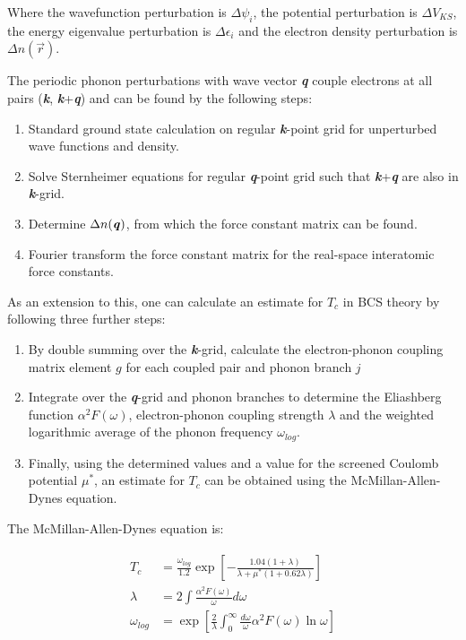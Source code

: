 \documentclass[a4paper,12pt]{article}
\begin{document}
\noindent Where the wavefunction perturbation is $\Delta\psi_i$, the potential perturbation is $\Delta V_{KS}$, the energy eigenvalue perturbation is $\Delta\epsilon_i$ and the electron density perturbation is $\Delta n(\vec{r})$.

\bigskip
\noindent The periodic phonon perturbations with wave vector \textbf{\textit{q}} couple electrons at all pairs (\textbf{\textit{k}}, \textbf{\textit{k}}+\textbf{\textit{q}}) and can be found by the following steps:

\begin{enumerate}
	\item Standard ground state calculation on regular \textbf{\textit{k}}-point grid for unperturbed wave functions and density.
	\item Solve Sternheimer equations for regular \textbf{\textit{q}}-point grid such that \textbf{\textit{k}}+\textbf{\textit{q}} are also in \textbf{\textit{k}}-grid.
	\item Determine $\Delta n(\textbf{\textit{q}})$, from which the force constant matrix can be found.
	\item Fourier transform the force constant matrix for the real-space interatomic force constants.
\end{enumerate}

\noindent As an extension to this, one can calculate an estimate for $T_c$ in BCS theory by following three further steps:

\begin{enumerate}
	\item By double summing over the \textit{\textbf{k}}-grid, calculate the electron-phonon coupling matrix element $g$ for each coupled pair and phonon branch $j$
	\item Integrate over the \textit{\textbf{q}}-grid and phonon branches to determine the Eliashberg function $\alpha^2F(\omega)$, electron-phonon coupling strength $\lambda$ and the weighted logarithmic average of the phonon frequency $\omega_{log}$.
	\item Finally, using the determined values and a value for the screened Coulomb potential $\mu^*$, an estimate for $T_c$ can be obtained using the McMillan-Allen-Dynes equation.
\end{enumerate}

\noindent The McMillan-Allen-Dynes equation is:

\begin{align}
\begin{split}
T_c &= \frac{\omega_{log}}{1.2}\exp\left[ -\frac{1.04(1+\lambda)}{\lambda + \mu^*(1+0.62\lambda)}\right] \\
\lambda &= 2\int\frac{\alpha^2F(\omega)}{\omega}d\omega \\
\omega_{log} &= \exp\left[ \frac{2}{\lambda}\int_0^{\infty}\frac{d\omega}{\omega}\alpha^2F(\omega)\ln\omega\right]
\end{split}
\end{align}
\end{document}
